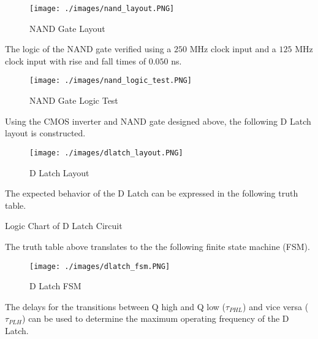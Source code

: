 \FloatBarrier

\begin{figure}[h!]
	\centering
	\texttt{[image: ./images/nand\_layout.PNG]}
	\caption{NAND Gate Layout}
	\label{fig:nand_layout}
\end{figure}

\FloatBarrier

The logic of the NAND gate verified using a $250$ \si{\mega\hertz} clock input and a $125$ \si{\mega\hertz} clock input with rise and fall times of $0.050$ \si{\nano\second}.

\FloatBarrier

\begin{figure}[h!]
	\centering
	\texttt{[image: ./images/nand\_logic\_test.PNG]}
	\caption{NAND Gate Logic Test}
	\label{fig:inverter_layout_vtc}
\end{figure}

\FloatBarrier

Using the CMOS inverter and NAND gate designed above, the following D Latch layout is constructed.

\FloatBarrier

\begin{figure}[h!]
	\centering
	\texttt{[image: ./images/dlatch\_layout.PNG]}
	\caption{D Latch Layout}
	\label{fig:dlatch_layout}
\end{figure}

\FloatBarrier

The expected behavior of the D Latch can be expressed in the following truth table.

\FloatBarrier

\begin{table}[h!]
	\centering
	\caption{Logic Chart of D Latch Circuit}
	\label{tab:dlatch_logic}
\end{table}

\FloatBarrier

The truth table above translates to the the following finite state machine (FSM).

\FloatBarrier

\begin{figure}[h!]
	\centering
	\texttt{[image: ./images/dlatch\_fsm.PNG]}
	\caption{D Latch FSM}
	\label{fig:dlatch_fsm}
\end{figure}

\FloatBarrier

The delays for the transitions between Q high and Q low ($\tau_{PHL}$) and vice versa ($\tau_{PLH}$) can be used to determine the maximum operating frequency of the D Latch.

